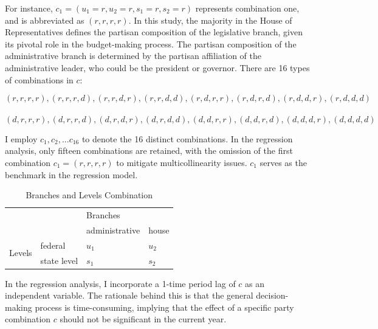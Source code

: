 \documentclass[man]{apa7}
\begin{document}
For instance, $c_1 = (u_1 = r, u_2 = r, s_1 = r, s_2 = r)$ represents combination one, and is abbreviated as $(r, r, r, r)$. In this study, the majority in the House of Representatives defines the partisan composition of the legislative branch, given its pivotal role in the budget-making process. The partisan composition of the administrative branch is determined by the partisan affiliation of the administrative leader, who could be the president or governor. There are 16 types of combinations in $c$:

$$(r, r, r, r), (r, r, r, d), (r, r, d, r), (r, r, d, d), (r, d, r, r), (r, d, r, d), (r, d, d, r), (r, d, d, d)$$\\$$(d, r, r, r), (d, r, r, d), (d, r, d, r), (d, r, d, d), (d, d, r, r), (d, d, r, d), (d, d, d, r), (d, d, d, d) $$

I employ $c_1, c_2, . . . c_{16}$ to denote the 16 distinct combinations. In the regression analysis, only fifteen combinations are retained, with the omission of the first combination $c_1 = (r, r, r, r)$ to mitigate multicollinearity issues. $c_1$ serves as the benchmark in the regression model.

\begin{table}[H]
  \centering
  \caption{Branches and Levels Combination}
  \begin{tabular}{cp{7.145em}p{8.43em}p{6.145em}}
    \toprule
    \multicolumn{2}{c}{\multirow{2}[4]{*}{}}       & \multicolumn{2}{p{14.575em}}{Branches}                 \\
    \cmidrule{3-4}    \multicolumn{2}{c}{}         & administrative                         & house         \\
    \midrule
    \multicolumn{1}{c}{\multirow{2}[4]{*}{Levels}} & federal                                & $u_1$ & $u_2$ \\
    \cmidrule{2-4}                                 & state level                            & $s_1$ & $s_2$ \\
    \bottomrule
  \end{tabular}%
  \label{Table 2.6}%
\end{table}%


In the regression analysis, I incorporate a 1-time period lag of $c$ as an independent variable. The rationale behind this is that the general decision-making process is time-consuming, implying that the effect of a specific party combination $c$ should not be significant in the current year.
\end{document}
